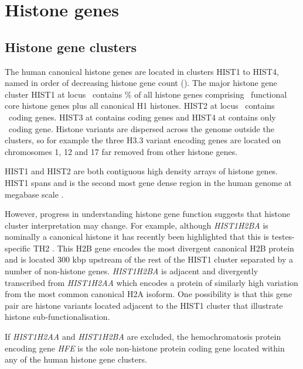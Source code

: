 \section{Histone genes}

  \subsection{Histone gene clusters}
    The human canonical histone genes are located in clusters HIST1 to HIST4, 
	named in order of decreasing histone gene count ().
	The major histone gene cluster HIST1 at locus~\HISTOneLocus{}  
	contains \% of all histone genes 
	comprising \CodingGenesInHISTOne{}~functional core histone genes plus all canonical H1 histones. 
	HIST2 at locus~\HISTTwoLocus{} contains \CodingGenesInHISTTwo{}~coding genes. 
	HIST3 at \HISTThreeLocus{} contains \CodingGenesInHISTThree{} coding genes 
	and HIST4 at \HISTFourLocus{} contains only \CodingGenesInHISTFour{}~coding gene. 
	Histone variants are dispersed across the genome outside the clusters, 
	so for example the three H3.3 variant encoding genes are located on chromosomes 1, 12 and 17 
	far removed from other histone genes.

	HIST1 and HIST2 are both contiguous high density arrays of histone genes. 
	HIST1 spans \HISTOneSpan{} 
	and is the second most gene dense region in the human genome at megabase scale \citep{MHC-III-analysis}.

	However, progress in understanding histone gene function suggests 
	that histone cluster interpretation may change. 
	For example, although \textit{HIST1H2BA} is nominally a canonical histone 
	it has recently been highlighted that this is testes-specific TH2 .
	This H2B gene encodes the most divergent canonical H2B protein 
	and is located 300 kbp upstream of the rest of the HIST1 cluster 
	separated by a number of non-histone genes. 
	\textit{HIST1H2BA} is adjacent and divergently transcribed from \textit{HIST1H2AA} 
	which encodes a protein of similarly high variation from the most common canonical H2A isoform. 
	One possibility is that this gene pair are histone variants 
	located adjacent to the HIST1 cluster that illustrate histone sub-functionalisation.

	If \textit{HIST1H2AA} and \textit{HIST1H2BA} are excluded, 
	the hemochromatosis protein encoding gene \textit{HFE}  
	is the sole non-histone protein coding gene located within any of the human histone gene clusters. 

